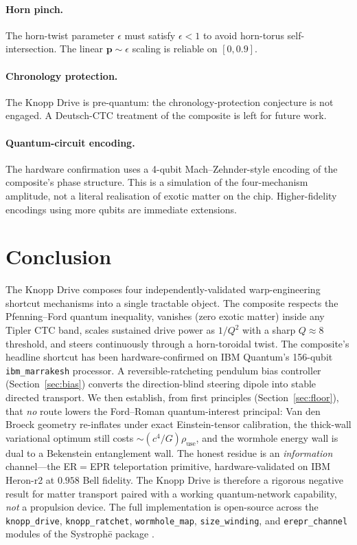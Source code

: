 \documentclass[11pt,a4paper]{article}
\begin{document}
\paragraph{Horn pinch.} The horn-twist parameter $\epsilon$ must satisfy $\epsilon<1$ to avoid horn-torus self-intersection. The linear $\bm{p}\sim\epsilon$ scaling is reliable on $[0,0.9]$.

\paragraph{Chronology protection.} The Knopp Drive is pre-quantum: the chronology-protection conjecture \cite{Hawking1992} is not engaged. A Deutsch-CTC \cite{Deutsch1991} treatment of the composite is left for future work.

\paragraph{Quantum-circuit encoding.} The hardware confirmation uses a 4-qubit Mach--Zehnder-style encoding of the composite's phase structure. This is a simulation of the four-mechanism amplitude, not a literal realisation of exotic matter on the chip. Higher-fidelity encodings using more qubits are immediate extensions.

\section{Conclusion}

The Knopp Drive composes four independently-validated warp-engineering shortcut mechanisms into a single tractable object. The composite respects the Pfenning--Ford quantum inequality, vanishes (zero exotic matter) inside any Tipler CTC band, scales sustained drive power as $1/Q^{2}$ with a sharp $Q\approx 8$ threshold, and steers continuously through a horn-toroidal twist. The composite's headline shortcut has been hardware-confirmed on IBM Quantum's 156-qubit \texttt{ibm\_marrakesh} processor. A reversible-ratcheting pendulum bias controller (Section~\ref{sec:bias}) converts the direction-blind steering dipole into stable directed transport. We then establish, from first principles (Section~\ref{sec:floor}), that \emph{no} route lowers the Ford--Roman quantum-interest principal: Van den Broeck geometry re-inflates under exact Einstein-tensor calibration, the thick-wall variational optimum still costs $\sim(c^{4}/G)\rho_{\mathrm{use}}$, and the wormhole energy wall is dual to a Bekenstein entanglement wall. The honest residue is an \emph{information} channel---the ER$=$EPR teleportation primitive, hardware-validated on IBM Heron-r2 at $0.958$ Bell fidelity. The Knopp Drive is therefore a rigorous negative result for matter transport paired with a working quantum-network capability, \emph{not} a propulsion device. The full implementation is open-source across the \texttt{knopp\_drive}, \texttt{knopp\_ratchet}, \texttt{wormhole\_map}, \texttt{size\_winding}, and \texttt{erepr\_channel} modules of the Systroph\=e package \cite{SystropheRepo}.
\end{document}
